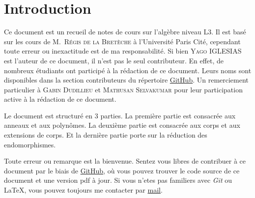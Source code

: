 
\section{Introduction}

Ce document est un recueil de notes de cours sur l'algèbre niveau L3. Il est
basé sur les cours de M.~\textsc{Régis de la Bretèche} à l'Université Paris Cité, cependant toute 
erreur ou inexactitude est de ma responsabilité.
Si bien \textsc{Yago IGLESIAS} est l'auteur de ce document, il n'est pas
le seul contributeur. En effet, de nombreux étudiants ont participé à la
rédaction de ce document. Leurs noms sont disponibles dans la section
contributeurs du répertoire \href{https://github.com/Yag000/algebre-II-notes/graphs/contributors}{GitHub}.
Un remerciement particulier à \textsc{Gabin Dudillieu} et \textsc{Mathusan Selvakumar} pour leur
participation active à la rédaction de ce document.
\vspace{0.5cm}

Le document est structuré en 3 parties. La première partie est consacrée aux anneaux et aux polynômes.
La deuxième partie est consacrée aux corps et aux extensions de corps. Et la dernière partie porte sur
la réduction des endomorphismes.
\vspace{0.5cm}

Toute erreur ou remarque est la bienvenue. 
Sentez vous libres de contribuer à ce document par le biais de \href{https://github.com/Yag000/algebre-II-notes}{GitHub}, 
où vous pouvez trouver le code source de ce document et une version pdf à jour.
Si vous n'etes pas familiers avec \textit{Git} ou \LaTeX , vous pouvez toujours me contacter
par \href{mailto: yago.iglesias.vazquez@gmail.com}{mail}.



